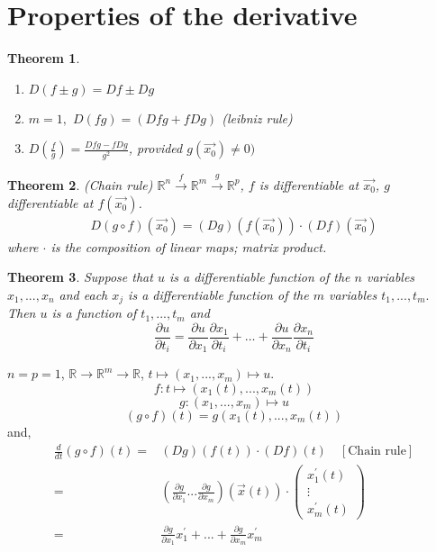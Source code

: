 \documentclass[12pt]{book}
\newtheorem{theorem}{Theorem}[section]
\theoremstyle{definition}
\theoremstyle{remark}
\begin{document}
    \section{Properties of the derivative}
    \begin{theorem}$ $ 
      \begin{enumerate}
        \item $D(f\pm g) = Df \pm Dg$
        \item $m = 1,$ $D(fg) = (Dfg + fDg)$ (leibniz rule)
        \item $D\left(\frac{f}{g}\right) = \frac{Dfg - fDg}{g^2} $, provided $g(\vec{{x_0}}) \neq 0)$
      \end{enumerate}
    \end{theorem}
      \begin{theorem}(Chain rule)
        $\mathbb{R}^n \overset{f}{\rightarrow} \mathbb{R}^m \overset{g}{\rightarrow} \mathbb{R}^p$, $f$ is differentiable at $\vec{{x_0}}$, $g$ differentiable at $f(\vec{{x_0}})$. 
        \begin{equation*}
          \begin{split}
            D(g \circ f)(\vec{{x_0}}) = (Dg)(f(\vec{{x_0}} ))\cdot (Df)(\vec{{x_0}} )
          \end{split}
        \end{equation*}
        where $\cdot$ is the composition of linear maps; matrix product.  
      \end{theorem}
      \begin{theorem} \label{Chain Rule (General Version)}
        Suppose that $u$ is a differentiable function of the $n$ variables $x_1,..., x_n$ and each $x_j$ is a differentiable function of the $m$ variables $t_1, ..., t_m.$ Then $u$ is a function of $t_1,..., t_m$ and 
        $$ \frac{\partial {u}}{\partial {t_i}} = \frac{\partial {u}}{\partial {x_1}} \frac{\partial {x_1}}{\partial {t_i}} + \hdots + \frac{\partial {u}}{\partial {x_n}} \frac{\partial {x_n}}{\partial {t_i}} {} $$
      \end{theorem}
      \begin{example}
        $n = p = 1$, $\mathbb{R}\rightarrow \mathbb{R}^m \rightarrow \mathbb{R}$, $t \mapsto (x_1, ..., x_m )\mapsto u$.  
        $$f: t \mapsto (x_1(t), ... , x_m(t))$$
        $$g: (x_1, ..., x_m) \mapsto u $$
        $$(g \circ f) (t) = g(x_1(t), ...,x_m (t)) $$
        and, 
      \begin{equation*}
        \begin{split}
          \frac{d}{dt} (g \circ f)(t) =&  (Dg)(f(t)) \cdot (Df)(t) \quad [\text{Chain rule}]\\ 
          =& \left(\frac{\partial g}{\partial x_1} ... \frac{\partial g}{\partial x_m}   \right)(\vec{{x}} (t))\cdot \begin{pmatrix} x_1^\prime (t) \\ \vdots \\ x^\prime_m(t)
          \end{pmatrix} \\ 
          =& \frac{\partial g}{\partial x_1}x^\prime_1 + ... + \frac{\partial g}{\partial x_m} x^\prime_m 
        \end{split}
      \end{equation*} 
      \end{example} 
\end{document}
